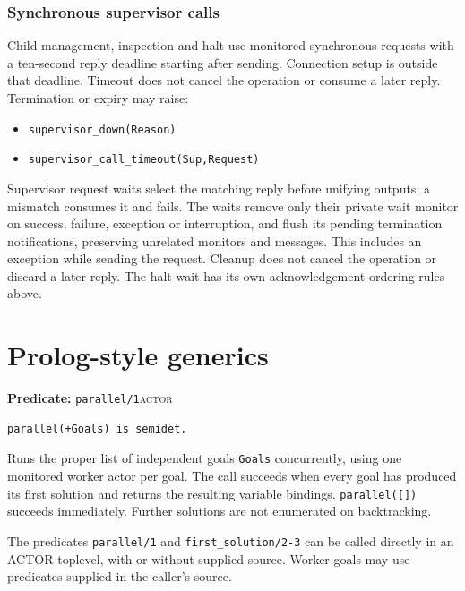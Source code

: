 \subsubsection{Synchronous supervisor calls}\label{sec:manual-supervisor-waits}
Child management, inspection and halt use monitored synchronous requests with a ten-second reply
deadline starting after sending. Connection setup is outside that deadline. Timeout does not cancel
the operation or consume a later reply. Termination or expiry may raise:

\begin{itemize}
\item \texttt{supervisor\_\allowbreak{}down(\allowbreak{}Reason)}
\item \texttt{supervisor\_\allowbreak{}call\_\allowbreak{}timeout(\allowbreak{}Sup,\allowbreak{}Request)}
\end{itemize}

Supervisor request waits select the matching reply before unifying outputs; a mismatch consumes it
and fails. The waits remove only their private wait monitor on success, failure, exception or
interruption, and flush its pending termination notifications, preserving unrelated monitors and
messages. This includes an exception while sending the request. Cleanup does not cancel the
operation or discard a later reply. The halt wait has its own acknowledgement-ordering
rules above.



\section{Prolog-style generics}\label{sec:actor-predicate-generics}
\noindent \textbf{Predicate:} \texttt{parallel/\allowbreak{}1}\hfill\textsc{actor}

\begin{verbatim}
parallel(+Goals) is semidet.
\end{verbatim}

\noindent Runs the proper list of independent goals \texttt{Goals}
concurrently, using one monitored worker actor per goal. The call succeeds
when every goal has produced its first solution and returns the resulting
variable bindings. \texttt{parallel(\allowbreak{}[])} succeeds immediately. Further
solutions are not enumerated on backtracking.

The predicates \texttt{parallel/1} and \texttt{first\_solution/2-3} can be called directly
in an ACTOR toplevel, with or without supplied source. Worker goals may use predicates
supplied in the caller's source.

